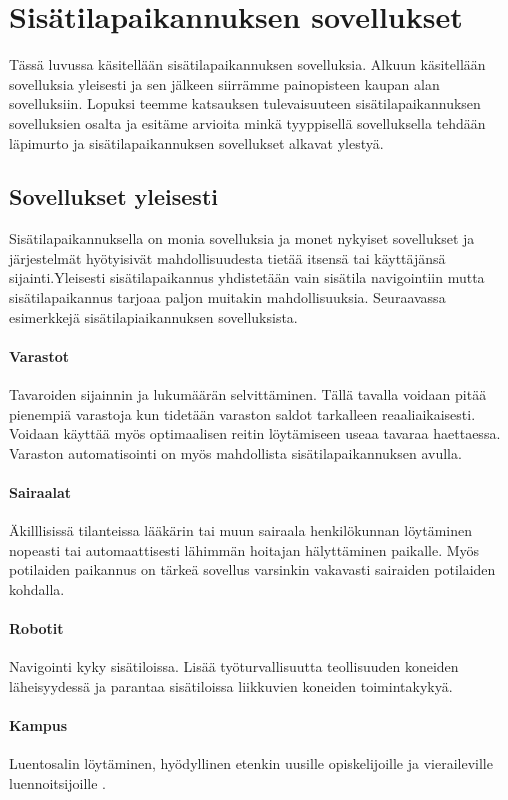 \section{Sisätilapaikannuksen sovellukset}
Tässä luvussa käsitellään sisätilapaikannuksen sovelluksia. Alkuun käsitellään sovelluksia yleisesti ja sen jälkeen siirrämme painopisteen kaupan alan sovelluksiin. Lopuksi teemme katsauksen tulevaisuuteen sisätilapaikannuksen sovelluksien osalta ja esitäme arvioita minkä tyyppisellä sovelluksella tehdään läpimurto ja sisätilapaikannuksen sovellukset alkavat ylestyä.

\subsection{Sovellukset yleisesti}
Sisätilapaikannuksella on monia sovelluksia ja monet nykyiset sovellukset ja järjestelmät hyötyisivät mahdollisuudesta tietää itsensä tai käyttäjänsä sijainti.Yleisesti sisätilapaikannus yhdistetään vain sisätila navigointiin mutta sisätilapaikannus tarjoaa paljon muitakin mahdollisuuksia. Seuraavassa esimerkkejä sisätilapiaikannuksen sovelluksista. 

\paragraph{Varastot} Tavaroiden sijainnin ja lukumäärän selvittäminen. Tällä tavalla voidaan pitää pienempiä varastoja kun tidetään varaston saldot tarkalleen reaaliaikaisesti. Voidaan käyttää myös optimaalisen reitin löytämiseen useaa tavaraa haettaessa. Varaston automatisointi on myös mahdollista sisätilapaikannuksen avulla.
\paragraph{Sairaalat} Äkilllisissä tilanteissa lääkärin tai muun sairaala henkilökunnan löytäminen nopeasti\cite{ibeacon} tai automaattisesti lähimmän hoitajan hälyttäminen paikalle. Myös potilaiden paikannus on tärkeä sovellus varsinkin vakavasti sairaiden potilaiden kohdalla.
\paragraph{Robotit} Navigointi kyky sisätiloissa. Lisää työturvallisuutta teollisuuden koneiden läheisyydessä ja parantaa sisätiloissa liikkuvien koneiden toimintakykyä.\cite{lips}
\paragraph{Kampus} Luentosalin löytäminen, hyödyllinen etenkin uusille opiskelijoille ja vieraileville luennoitsijoille \cite{campus}.
